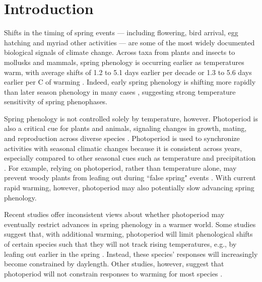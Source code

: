 \documentclass{article}
\begin{document}

\section*{Introduction}
\par Shifts in the timing of spring events --- including flowering, bird arrival, egg hatching and myriad other activities --- are some of the most widely documented biological signals of climate change. Across taxa from plants and insects to mollusks and mammals, spring phenology is occurring earlier as temperatures warm, with average shifts of 1.2 to 5.1 days earlier per decade \citep{bradley1999,parmesan2003, root2003} or 1.3 to 5.6 days earlier per \degree C of warming \citep{Wolkovich:2012n,polgar2013}. Indeed, early spring phenology is shifting more rapidly than later season phenology in many cases \citep{bradley1999,menzel2006}, suggesting strong temperature sensitivity of spring phenophases.

\par Spring phenology is not controlled solely by temperature, however. Photoperiod is also a critical cue for plants and animals, signaling changes in growth, mating, and reproduction across diverse species \citep[e.g.,][]{Howe:1996,flynn2018,solbakken1994,mcallan2006,lagercrantz2009}. Photoperiod is used to synchronize activities with seasonal climatic changes \citep[e.g.,][]{Hsu:2011,Singh:2017,Basler:2012} because it is consistent across years, especially compared to other seasonal cues such as temperature and precipitation \citep{saikkonen2012}. For example, relying on photoperiod, rather than temperature alone, may prevent woody plants from leafing out during ``false spring" events \citep[unusually warm periods during winter that are followed by a return of cold temperatures][] {Gu2008}. With current rapid warming, however, photoperiod may also potentially slow advancing spring phenology. 

\par Recent studies offer inconsistent views about whether photoperiod may eventually restrict advances in spring phenology in a warmer world. Some studies suggest that, with additional warming, photoperiod will limit phenological shifts of certain species such that they will not track rising temperatures, e.g., by leafing out earlier in the spring \citep{koerner2010b,way2015}. Instead, these species' responses will increasingly become constrained by daylength. Other studies, however, suggest that photoperiod will not constrain responses to warming for most species \citep{zohner2016,chuine2010}. 
\end{document}
